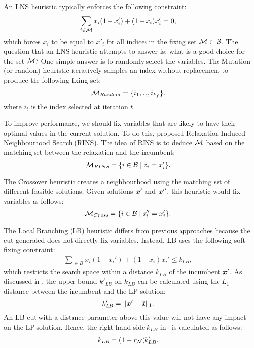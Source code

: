 \documentclass[3p, authoryear, times]{elsarticle}
\begin{document}
An LNS heuristic typically enforces the following constraint: 
\begin{align}
    \sum_{i \in \mathcal{M}} x_i (1 - x'_i) + (1 - x_i) x'_i  = 0, \label{eq:lns:variable_fixing}
\end{align}
which forces $x_i$ to be equal to $x'_i$ for all indices in the fixing set $\mathcal{M} \subset \mathcal{B}$. The question that an LNS heuristic attempts to answer is: what is a good choice for the set $\mathcal{M}$?  One simple answer is to randomly select the variables. The Mutation (or random) heuristic \citep{rothberg_evolutionary_2007} iteratively samples an index without replacement to produce the following fixing set: 
\begin{align}
    \mathcal{M}_{Random} = \{i_1, ..., i_{k_f}\}. 
\end{align}
where $i_t$ is the index selected at iteration $t$.

To improve performance, we should fix variables that are likely to have their optimal values in the current solution. To do this, \cite{danna_exploring_2005} proposed Relaxation Induced Neighbourhood Search (RINS). The idea of RINS is to deduce $\mathcal{M}$ based on the matching set between the relaxation and the incumbent: 
\begin{align}
    \mathcal{M}_{RINS} = \{ i \in \mathcal{B} \mid \tilde{x}_i = x_i' \}. 
\end{align}

The Crossover heuristic \citep{rothberg_evolutionary_2007} creates a neighbourhood using the matching set of different feasible solutions. Given solutions $\boldsymbol{x}' $ and $\boldsymbol{x}''$, this heuristic would fix variables as follows: 
\begin{align}
    \mathcal{M}_{Cross} = \{ i \in \mathcal{B} \mid  x_i'' = x_i' \}. 
\end{align}

The Local Branching (LB) heuristic differs from previous approaches because the cut generated does not directly fix variables. Instead, LB uses the following soft-fixing constraint: 
\begin{align}\label{eq:lns:lb}
    \sum_{i\in B} x_i  (1 - x_i') + (1 - x_i) x_i' \leq k_{LB}, 
\end{align} 
which restricts the search space within a distance $k_{LB}$ of the incumbent $\boldsymbol{x}'$. As discussed in \cite{liu_learning_2022}, the upper bound $k'_{LB}$ on $k_{LB}$ can be calculated using the $L_1$ distance between the incumbent and the LP solution:
\begin{align}\label{eq:lns:kmax}
    k'_{LB} = \| \boldsymbol{x}' - \tilde{\boldsymbol{x}} \|_1. 
\end{align} 
An LB cut with a distance parameter above this value will not have any impact on the LP solution. Hence, the right-hand side $k_{LB}$ in~ is calculated as follows: 
\begin{align}\label{eq:lns:klb}
    k_{LB} = (1 - r_{\mathcal{N}}) k'_{LB}.
\end{align} 
\end{document}
